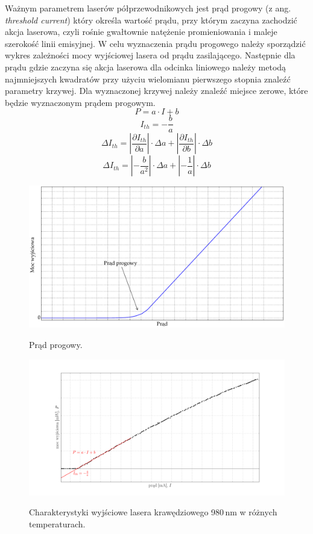 \documentclass[a4paper, portrait,12pt]{report}
\begin{document}
Ważnym parametrem laserów półprzewodnikowych jest prąd progowy (z ang. \textit{threshold
current}) który określa wartość prądu, przy którym zaczyna zachodzić akcja laserowa, czyli
rośnie gwałtownie natężenie promieniowania i maleje szerokość linii emisyjnej. W celu wyznaczenia prądu progowego należy sporządzić wykres zależności mocy wyjściowej lasera od prądu zasilającego. Następnie dla prądu gdzie zaczyna się akcja laserowa dla odcinka liniowego należy metodą najmniejszych kwadratów przy użyciu wielomianu pierwszego stopnia znaleźć parametry krzywej. Dla wyznaczonej krzywej należy znaleźć miejsce zerowe, które będzie wyznaczonym prądem progowym.
\begin{equation}
P = a \cdot I + b
\end{equation}
\begin{equation}
I_{th} = -\frac{b}{a}
\end{equation}
\begin{equation}
\Delta I_{th} = \left\lvert \frac{\partial I_{th}}{\partial a} \right\rvert \cdot \Delta a + \left\lvert \frac{\partial I_{th}}{\partial b} \right\rvert \cdot \Delta b
\end{equation}
\begin{equation}
\Delta I_{th} = \left\lvert -\frac{b}{a^2} \right\rvert \cdot \Delta a + \left\lvert -\frac{1}{a} \right\rvert \cdot \Delta b 
\end{equation}
\begin{figure}
\center
  \includegraphics[scale=0.30]{plot_theory2.eps}
  \label{rys1}
  \caption{Prąd progowy.} 
\end{figure}
\begin{figure}
\center
  \includegraphics[scale=0.30]{plot_theory_i_th.png}
  \label{rys1}
  \caption{Charakterystyki wyjściowe lasera krawędziowego 980\,nm w różnych temperaturach. } 
\end{figure}
\end{document}
